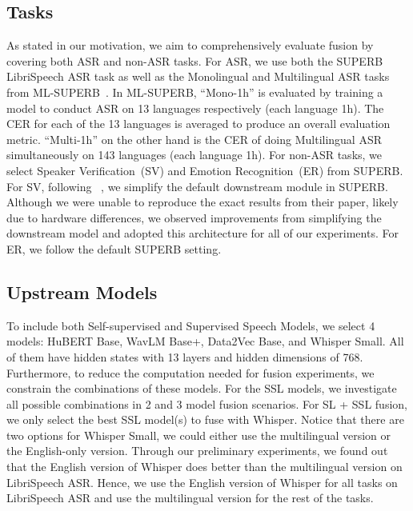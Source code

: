 % 
% 
% 
\subsection{Tasks}
As stated in our motivation, we aim to comprehensively evaluate fusion by covering both ASR and non-ASR tasks.
For ASR, we use both the SUPERB~\cite{yang21c_superb} LibriSpeech ASR task as well as
the Monolingual and Multilingual ASR tasks from ML-SUPERB~\cite{shi23g_mlsuperb}.
In ML-SUPERB, ``Mono-1h'' is evaluated by training a model to conduct ASR on 13 languages respectively (each language 1h).
The CER for each of the 13 languages is averaged to produce an overall evaluation metric.
``Multi-1h'' on the other hand is the CER of doing Multilingual ASR simultaneously on 143 languages (each language 1h).
For non-ASR tasks, we select Speaker Verification~(SV) and Emotion Recognition~(ER) from SUPERB.
For SV, following~\cite{aldeneh24_SVDS}
, we simplify the default downstream module in SUPERB.
Although we were unable to reproduce the exact results from their paper, likely due to hardware differences, we observed improvements from simplifying the downstream model and adopted this architecture for all of our experiments.
For ER, we follow the default SUPERB setting.

\noindent
\subsection{Upstream Models}
To include both Self-supervised and Supervised Speech Models, we select 4 models: HuBERT Base, WavLM Base+, Data2Vec Base, and Whisper Small.
All of them have hidden states with 13 layers and hidden dimensions of 768.
Furthermore, to reduce the computation needed for fusion experiments, we constrain the combinations of these models.
For the SSL models, we investigate all possible combinations in 2 and 3 model fusion scenarios.
For SL + SSL fusion, we only select the best SSL model(s) to fuse with Whisper.
Notice that there are two options for Whisper Small, we could either use the multilingual version or the English-only version.
Through our preliminary experiments, we found out that the English version of Whisper does better than the multilingual version on LibriSpeech ASR.
Hence, we use the English version of Whisper for all tasks on LibriSpeech ASR and use the multilingual version for the rest of the tasks.

